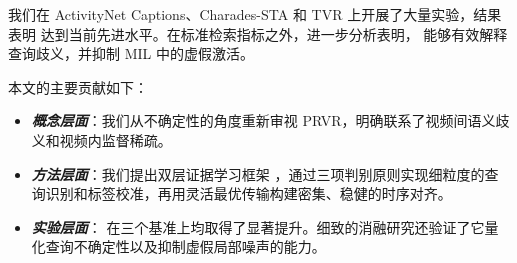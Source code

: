 我们在 ActivityNet Captions\cite{krishna2017dense}、Charades-STA\cite{gao2017tall} 和 TVR\cite{lei2020tvr} 上开展了大量实验，结果表明 \modelname{} 达到当前先进水平。在标准检索指标之外，进一步分析表明，\modelname{} 能够有效解释查询歧义，并抑制 MIL 中的虚假激活。

本文的主要贡献如下：
\vspace{-.2cm}
\begin{itemize}
    \item[$\bullet$] \emph{\textbf{概念层面}}：我们从不确定性的角度重新审视 PRVR，明确联系了视频间语义歧义和视频内监督稀疏。 \vspace{-.2cm}
    \item[$\bullet$] \emph{\textbf{方法层面}}：我们提出双层证据学习框架 \modelname{}，通过三项判别原则实现细粒度的查询识别和标签校准，再用灵活最优传输构建密集、稳健的时序对齐。\vspace{-.2cm}
    \item[$\bullet$] \emph{\textbf{实验层面}}：\modelname{} 在三个基准上均取得了显著提升。细致的消融研究还验证了它量化查询不确定性以及抑制虚假局部噪声的能力。
\end{itemize}